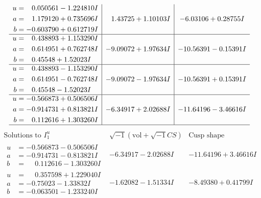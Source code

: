 \documentclass[1p]{elsarticle_modified}
\theoremstyle{definition}
\newcommand{\I}{\sqrt{-1}}
\begin{document}
$$\begin{array}{c|c|c}
\begin{aligned}
u &= \phantom{-}0.050561 - 1.224810 I \\
a &= \phantom{-}1.179120 + 0.735696 I \\
b &= -0.603790 + 0.612719 I\end{aligned}
 & \phantom{-}1.43725 + 1.10103 I & -6.03106 + 0.28755 I \\ \hline\begin{aligned}
u &= \phantom{-}0.438893 + 1.153290 I \\
a &= \phantom{-}0.614951 + 0.762748 I \\
b &= \phantom{-}0.45548 + 1.52023 I\end{aligned}
 & -9.09072 + 1.97634 I & -10.56391 - 0.15391 I \\ \hline\begin{aligned}
u &= \phantom{-}0.438893 - 1.153290 I \\
a &= \phantom{-}0.614951 - 0.762748 I \\
b &= \phantom{-}0.45548 - 1.52023 I\end{aligned}
 & -9.09072 - 1.97634 I & -10.56391 + 0.15391 I \\ \hline\begin{aligned}
u &= -0.566873 + 0.506506 I \\
a &= -0.914731 + 0.813821 I \\
b &= \phantom{-}0.112616 + 1.303260 I\end{aligned}
 & -6.34917 + 2.02688 I & -11.64196 - 3.46616 I\\
 \hline 
 \end{array}$$\newpage$$\begin{array}{c|c|c}  
\text{Solutions to }I^u_{1}& \I (\text{vol} + \sqrt{-1}CS) & \text{Cusp shape}\\
 \hline 
\begin{aligned}
u &= -0.566873 - 0.506506 I \\
a &= -0.914731 - 0.813821 I \\
b &= \phantom{-}0.112616 - 1.303260 I\end{aligned}
 & -6.34917 - 2.02688 I & -11.64196 + 3.46616 I \\ \hline\begin{aligned}
u &= \phantom{-}0.357598 + 1.229040 I \\
a &= -0.75023 - 1.33832 I \\
b &= -0.063501 - 1.233240 I\end{aligned}
 & -1.62082 - 1.51334 I & -8.49380 + 0.41799 I \\ \hline\begin{aligned}

\end{aligned}
\end{array}$$
\end{document}
